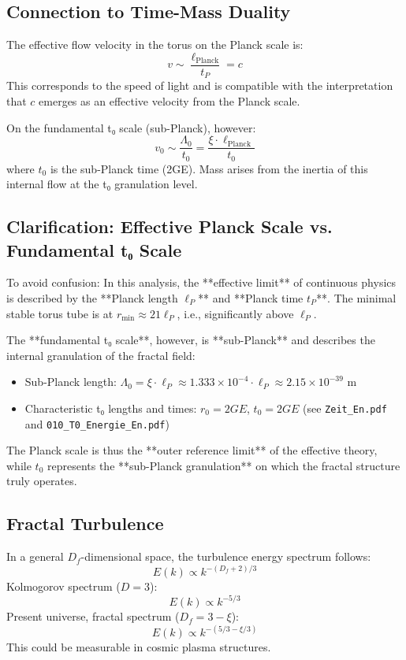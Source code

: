 \subsection{Connection to Time-Mass Duality}
The effective flow velocity in the torus on the Planck scale is:
\[
v \sim \frac{\ell_{\text{Planck}}}{t_P} = c
\]
This corresponds to the speed of light and is compatible with the interpretation that \( c \) emerges as an effective velocity from the Planck scale.

On the fundamental t₀ scale (sub-Planck), however:
\[
v_0 \sim \frac{\Lambda_0}{t_0} = \frac{\xi \cdot \ell_{\text{Planck}}}{t_0}
\]
where \( t_0 \) is the sub-Planck time (2GE). Mass arises from the inertia of this internal flow at the t₀ granulation level.

\subsection{Clarification: Effective Planck Scale vs. Fundamental t₀ Scale}
To avoid confusion: In this analysis, the **effective limit** of continuous physics is described by the **Planck length \( \ell_P \)** and **Planck time \( t_P \)**. The minimal stable torus tube is at \( r_{\min} \approx 21 \ell_P \), i.e., significantly above \( \ell_P \).

The **fundamental t₀ scale**, however, is **sub-Planck** and describes the internal granulation of the fractal field:
\begin{itemize}
	\item Sub-Planck length: \( \Lambda_0 = \xi \cdot \ell_P \approx 1.333 \times 10^{-4} \cdot \ell_P \approx 2.15 \times 10^{-39} \) m
	\item Characteristic t₀ lengths and times: \( r_0 = 2GE \), \( t_0 = 2GE \) (see \texttt{Zeit\_En.pdf} and \texttt{010\_T0\_Energie\_En.pdf})
\end{itemize}

The Planck scale is thus the **outer reference limit** of the effective theory, while \( t_0 \) represents the **sub-Planck granulation** on which the fractal structure truly operates.

\subsection{Fractal Turbulence}
In a general \(D_f\)-dimensional space, the turbulence energy spectrum follows:
\[
E(k) \propto k^{-(D_f + 2)/3}
\]
Kolmogorov spectrum (\( D = 3 \)):
\[
E(k) \propto k^{-5/3}
\]
Present universe, fractal spectrum (\( D_f = 3 - \xi \)):
\[
E(k) \propto k^{-(5/3 - \xi/3)}
\]
This could be measurable in cosmic plasma structures.

